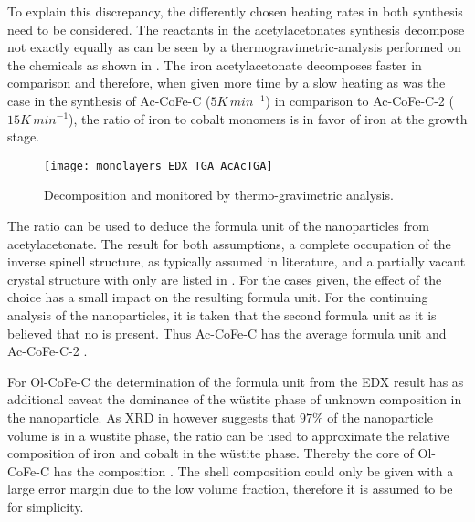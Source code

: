 \documentclass[\main/dresen_thesis.tex]{subfiles}
\begin{document}
  To explain this discrepancy, the differently chosen heating rates in both synthesis need to be considered.
  The reactants in the acetylacetonates synthesis decompose not exactly equally as can be seen by a thermogravimetric-analysis performed on the chemicals as shown in .
  The iron acetylacetonate decomposes faster in comparison and therefore, when given more time by a slow heating as was the case in the synthesis of Ac-CoFe-C ($5 \unit{K \, min^{-1}}$) in comparison to Ac-CoFe-C-2  ($15 \unit{K \, min^{-1}}$), the ratio of iron to cobalt monomers is in favor of iron at the growth stage.
  \begin{figure}[tb]
    \centering
    \texttt{[image: monolayers\_EDX\_TGA\_AcAcTGA]}
    \caption{\label{fig:monolayers:nanoparticle:edx:TGARefluxAcAc}Decomposition   and  monitored by thermo-gravimetric analysis.}
  \end{figure}

  The ratio can be used to deduce the formula unit of the nanoparticles from acetylacetonate.
  The result for both assumptions, a complete occupation of the inverse spinell structure, as typically assumed in literature, and a partially vacant crystal structure with only  are listed in .
  For the cases given, the effect of the choice has a small impact on the resulting formula unit.
  For the continuing analysis of the nanoparticles, it is taken that the second formula unit as it is believed that no  is present.
  Thus Ac-CoFe-C has the average formula unit  and Ac-CoFe-C-2 .

  For Ol-CoFe-C the determination of the formula unit from the EDX result has as additional caveat the dominance of the w\"ustite phase of unknown composition  in the nanoparticle.
  As XRD in  however suggests that $97 \%$ of the nanoparticle volume is in a wustite phase, the ratio can be used to approximate the relative composition of iron and cobalt in the w\"ustite phase.
  Thereby the core of Ol-CoFe-C has the composition .
  The shell composition could only be given with a large error margin due to the low volume fraction, therefore it is assumed to be  for simplicity.
\end{document}
